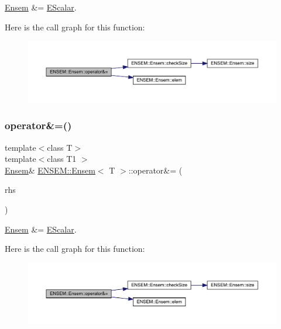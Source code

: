 \mbox{\hyperlink{classENSEM_1_1Ensem}{Ensem}} \&= \mbox{\hyperlink{classENSEM_1_1EScalar}{E\+Scalar}}. 

Here is the call graph for this function\+:
\nopagebreak
\begin{figure}[H]
\begin{center}
\leavevmode
\includegraphics[width=350pt]{d7/d3e/classENSEM_1_1Ensem_ab5e9900522968210e53ec66b09a402fe_cgraph}
\end{center}
\end{figure}
\mbox{\label{classENSEM_1_1Ensem_ab5e9900522968210e53ec66b09a402fe}} 
\subsubsection{\texorpdfstring{operator\&=()}{operator\&=()}\hspace{0.1cm}{\footnotesize\ttfamily [2/2]}}
{\footnotesize\ttfamily template$<$class T$>$ \\
template$<$class T1 $>$ \\
\mbox{\hyperlink{classENSEM_1_1Ensem}{Ensem}}\& \mbox{\hyperlink{classENSEM_1_1Ensem}{E\+N\+S\+E\+M\+::\+Ensem}}$<$ T $>$\+::operator\&= (\begin{DoxyParamCaption}\item[{const \mbox{\hyperlink{classENSEM_1_1EScalar}{E\+Scalar}}$<$ T1 $>$ \&}]{rhs }\end{DoxyParamCaption})\hspace{0.3cm}{\ttfamily [inline]}}



\mbox{\hyperlink{classENSEM_1_1Ensem}{Ensem}} \&= \mbox{\hyperlink{classENSEM_1_1EScalar}{E\+Scalar}}. 

Here is the call graph for this function\+:
\nopagebreak
\begin{figure}[H]
\begin{center}
\leavevmode
\includegraphics[width=350pt]{d7/d3e/classENSEM_1_1Ensem_ab5e9900522968210e53ec66b09a402fe_cgraph}
\end{center}
\end{figure}
\mbox{\label{classENSEM_1_1Ensem_abacb93dfca393ddb29f317d35e2fff7f}} 

